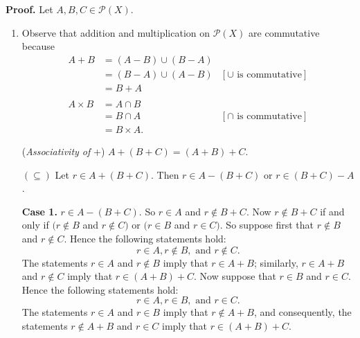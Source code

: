\begin{enumerate}
      \textbf{Proof.} Let $A, B, C \in \mathcal{P}(X)$.

      \begin{enumerate}
         \item Observe that addition and multiplication on $\mathcal{P}(X)$ are 
               commutative because
               \begin{align*}
                  A + B &= (A - B) \cup (B - A) \\
                     &= (B - A) \cup (A - B) &[\cup \text{ is commutative}] \\
                     &= B + A \\ \\
                  A \times B &= A \cap B \\
                     &= B \cap A &[\cap \text{ is commutative}] \\
                     &= B \times A.
               \end{align*}

               (\textit{Associativity of }+) $A + (B + C) = (A + B) + C$.

               $(\subseteq)$ Let $r \in A + (B + C)$. Then
               $r \in A - (B + C)$ or $r \in (B + C) - A$.

               \textbf{Case 1.} $r \in A - (B + C)$. So $r \in A$ and
               $r \notin B + C$. Now $r \notin B + C$ if and only if
               $(r \notin B$ and $r \notin C)$ or $(r \in B$ and $r \in C)$. So
               suppose first that $r \notin B$ and $r \notin C$. Hence the
               following statements hold:
               $$r \in A, r \notin B, \text{ and }r \notin C.$$
               The statements $r \in A$ and $r \notin B$ imply that
               $r \in A + B$; similarly, $r \in A + B$ and $r \notin C$ imply 
               that $r \in (A + B) + C$. Now suppose that
               $r \in B$ and $r \in C$. Hence the
               following statements hold:
               $$r \in A, r \in B, \text{ and }r \in C.$$
               The statements $r \in A$ and $r \in B$ imply that
               $r \notin A + B$, and consequently, the statements 
               $r \notin A + B$ and $r \in C$ imply that $r \in (A + B) + C$. \\


\end{enumerate}
\end{enumerate}
